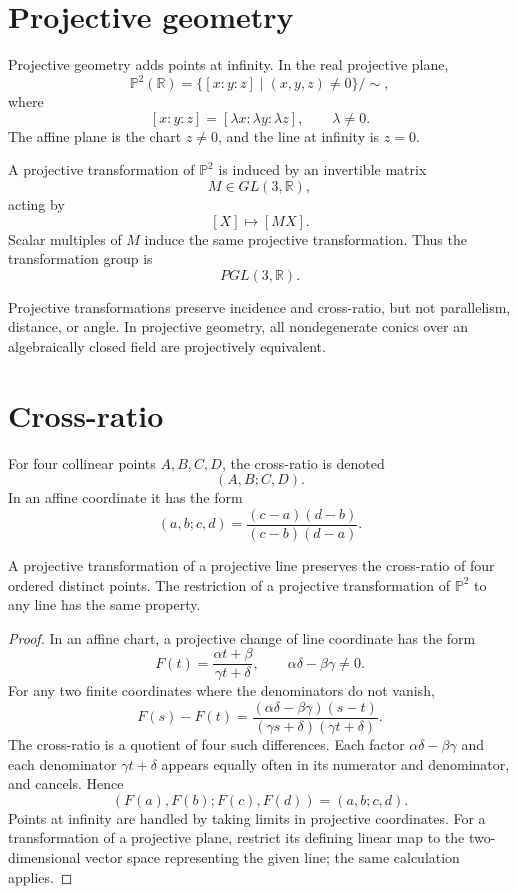 \section{Projective geometry}

Projective geometry adds points at infinity.  In the real projective plane,
\[
  \mathbb P^2(\mathbb R)=\{[x:y:z]\mid (x,y,z)\neq0\}/\sim,
\]
where
\[
  [x:y:z]=[\lambda x:\lambda y:\lambda z],\qquad \lambda\neq0.
\]
The affine plane is the chart \(z\neq0\), and the line at infinity is \(z=0\).

\begin{definition}
A projective transformation of \(\mathbb P^2\) is induced by an invertible matrix
\[
  M\in GL(3,\mathbb R),
\]
acting by
\[
  [X]\mapsto [MX].
\]
Scalar multiples of \(M\) induce the same projective transformation.  Thus the transformation group is
\[
  PGL(3,\mathbb R).
\]
\end{definition}

Projective transformations preserve incidence and cross-ratio, but not parallelism, distance, or angle.  In projective geometry, all nondegenerate conics over an algebraically closed field are projectively equivalent.


\section{Cross-ratio}

For four collinear points \(A,B,C,D\), the cross-ratio is denoted
\[
  (A,B;C,D).
\]
In an affine coordinate it has the form
\[
  (a,b;c,d)=\frac{(c-a)(d-b)}{(c-b)(d-a)}.
\]

\begin{theorem}
A projective transformation of a projective line preserves the cross-ratio of four ordered distinct points. The restriction of a projective transformation of $\mathbb P^2$ to any line has the same property.
\end{theorem}

\begin{proof}
In an affine chart, a projective change of line coordinate has the form
\[
 F(t)=\frac{\alpha t+\beta}{\gamma t+\delta},
 \qquad \alpha\delta-\beta\gamma\ne0.
\]
For any two finite coordinates where the denominators do not vanish,
\[
 F(s)-F(t)=
 \frac{(\alpha\delta-\beta\gamma)(s-t)}
 {(\gamma s+\delta)(\gamma t+\delta)}.
\]
The cross-ratio is a quotient of four such differences. Each factor $\alpha\delta-\beta\gamma$ and each denominator $\gamma t+\delta$ appears equally often in its numerator and denominator, and cancels. Hence
\[
 (F(a),F(b);F(c),F(d))=(a,b;c,d).
\]
Points at infinity are handled by taking limits in projective coordinates. For a transformation of a projective plane, restrict its defining linear map to the two-dimensional vector space representing the given line; the same calculation applies.
\end{proof}


